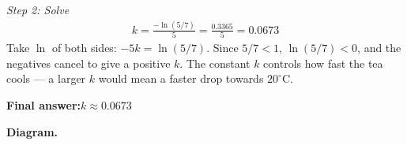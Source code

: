 \documentclass[11pt]{article}
\begin{document}
\textit{Step 2: Solve}
\[\begin{gathered}
k = \frac{-\ln(5/7)}{5} = \frac{0.3365}{5} = 0.0673
\end{gathered}\]
Take \( \ln \) of both sides: \( -5k = \ln(5/7) \). Since \( 5/7 < 1 \), \( \ln(5/7) < 0 \), and the negatives cancel to give a positive \( k \). The constant \( k \) controls how fast the tea cools --- a larger \( k \) would mean a faster drop towards \( 20^\circ \)C.

\begin{answerbox}
\textbf{Final answer:}\quad \(\displaystyle  k \approx 0.0673 \)
\end{answerbox}
\textbf{Diagram.}

\begin{center}
\end{center}
\end{document}
